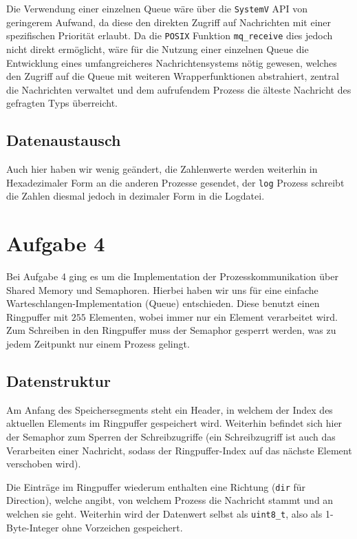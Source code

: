 \documentclass[12pt, a4paper]{scrartcl}
\begin{document}
Die Verwendung einer einzelnen Queue wäre über die \texttt{SystemV} API von 
geringerem Aufwand, da diese den direkten Zugriff auf Nachrichten mit einer
spezifischen Priorität erlaubt. Da die \texttt{POSIX} Funktion
\texttt{mq\_receive} dies jedoch nicht direkt ermöglicht, wäre für die Nutzung
einer einzelnen Queue die Entwicklung eines umfangreicheres Nachrichtensystems
nötig gewesen, welches den Zugriff auf die Queue mit weiteren Wrapperfunktionen
abstrahiert, zentral die Nachrichten verwaltet und dem aufrufendem Prozess die
älteste Nachricht des gefragten Typs überreicht.

\subsection{Datenaustausch}
Auch hier haben wir wenig geändert, die Zahlenwerte werden weiterhin in 
Hexadezimaler Form an die anderen Prozesse gesendet, der \texttt{log} 
Prozess schreibt die Zahlen diesmal jedoch in dezimaler Form in die Logdatei.

\clearpage
\section{Aufgabe 4}

Bei Aufgabe 4 ging es um die Implementation der Prozesskommunikation über
Shared Memory und Semaphoren. Hierbei haben wir uns für eine einfache
Warteschlangen-Implementation (Queue) entschieden. Diese benutzt einen
Ringpuffer mit $255$ Elementen, wobei immer nur ein Element verarbeitet
wird. Zum Schreiben in den Ringpuffer muss der Semaphor gesperrt werden, was zu
jedem Zeitpunkt nur einem Prozess gelingt.

\subsection{Datenstruktur}

Am Anfang des Speichersegments steht ein Header, in welchem der Index des
aktuellen Elements im Ringpuffer gespeichert wird. Weiterhin befindet sich hier
der Semaphor zum Sperren der Schreibzugriffe (ein Schreibzugriff ist auch das
Verarbeiten einer Nachricht, sodass der Ringpuffer-Index auf das nächste
Element verschoben wird).
\np

Die Einträge im Ringpuffer wiederum enthalten eine Richtung (\texttt{dir} für
Direction), welche angibt, von welchem Prozess die Nachricht stammt und an
welchen sie geht. Weiterhin wird der Datenwert selbst als \texttt{uint8\_t},
also als 1-Byte-Integer ohne Vorzeichen gespeichert.
\end{document}
